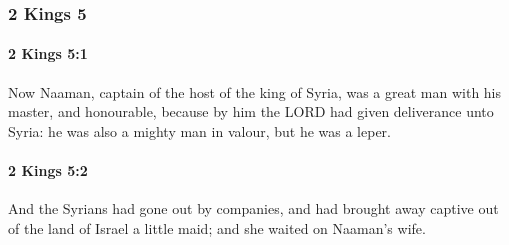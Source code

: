 	\subsubsection{2 Kings 5} %
		\label{2KINGS-5}

		\paragraph{2 Kings 5:1} %
			\label{2KINGS-5-1}

			Now Naaman, captain of the host of the king of Syria, was a great man with his master, and honourable, because by him the LORD had given deliverance unto Syria: he was also a mighty man in valour, but he was a leper.


		\paragraph{2 Kings 5:2} %
			\label{2KINGS-5-2}

			And the Syrians had gone out by companies, and had brought away captive out of the land of Israel a little maid; and she waited on Naaman’s wife.

